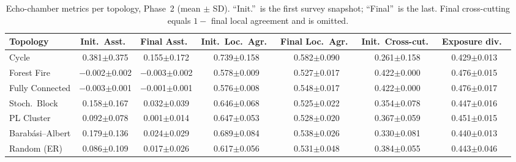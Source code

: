 \documentclass[11pt]{article}
\begin{document}
\begin{table}[h]
\centering
\small
\begin{tabular}{lcccccc}
\toprule
Topology & Init.\ Asst.\ & Final Asst.\ & Init.\ Loc.\ Agr.\ & Final Loc.\ Agr.\ & Init.\ Cross-cut.\ & Exposure div.\ \\
\midrule
Cycle               & 0.381$\pm$0.375    & 0.155$\pm$0.172   & 0.739$\pm$0.158 & 0.582$\pm$0.090 & 0.261$\pm$0.158 & 0.429$\pm$0.013 \\
Forest Fire         & $-$0.002$\pm$0.002 & $-$0.003$\pm$0.002 & 0.578$\pm$0.009 & 0.527$\pm$0.017 & 0.422$\pm$0.000 & 0.476$\pm$0.015 \\
Fully Connected     & $-$0.003$\pm$0.001 & $-$0.001$\pm$0.001 & 0.576$\pm$0.008 & 0.548$\pm$0.017 & 0.422$\pm$0.000 & 0.476$\pm$0.017 \\
Stoch.\ Block       & 0.158$\pm$0.167    & 0.032$\pm$0.039   & 0.646$\pm$0.068 & 0.525$\pm$0.022 & 0.354$\pm$0.078 & 0.447$\pm$0.016 \\
PL Cluster          & 0.092$\pm$0.078    & 0.001$\pm$0.014   & 0.647$\pm$0.053 & 0.528$\pm$0.020 & 0.367$\pm$0.059 & 0.451$\pm$0.015 \\
Barab\'{a}si--Albert & 0.179$\pm$0.136   & 0.024$\pm$0.029   & 0.689$\pm$0.084 & 0.538$\pm$0.026 & 0.330$\pm$0.081 & 0.440$\pm$0.013 \\
\midrule
Random (ER)         & 0.086$\pm$0.109    & 0.017$\pm$0.026   & 0.617$\pm$0.056 & 0.531$\pm$0.048 & 0.384$\pm$0.055 & 0.443$\pm$0.046 \\
\bottomrule
\end{tabular}
\caption{Echo-chamber metrics per topology, Phase~2 (mean $\pm$ SD). ``Init.''\ is the first survey snapshot; ``Final''\ is the last. Final cross-cutting equals $1-$ final local agreement and is omitted.}
\label{tab:appendix_echo_per_topo}
\end{table}
\end{document}
